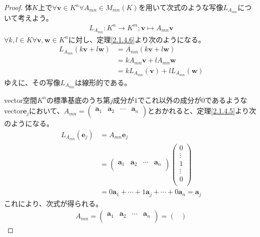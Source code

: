 \documentclass[dvipdfmx]{jsarticle}
\begin{document}
\begin{proof}
体$K$上で$\forall\mathbf{v} \in K^{n}\forall A_{mn} \in M_{mn}(K)$を用いて次式のような写像$L_{A_{mn}}$について考えよう。
\begin{align*}
L_{A_{mn}}:K^{n} \rightarrow K^{m};\mathbf{v} \mapsto A_{mn}\mathbf{v}
\end{align*}
$\forall k,l \in K\forall\mathbf{v},\mathbf{w} \in K^{n}$に対し、定理\ref{2.1.4.6}より次のようになる。
\begin{align*}
L_{A_{mn}}\left( k\mathbf{v} + l\mathbf{w} \right) &= A_{mn}\left( k\mathbf{v} + l\mathbf{w} \right)\\
&= kA_{mn}\mathbf{v} + lA_{mn}\mathbf{w}\\
&= kL_{A_{mn}}\left( \mathbf{v} \right) + lL_{A_{mn}}\left( \mathbf{w} \right)
\end{align*}
ゆえに、その写像$L_{A_{mn}}$は線形的である。\par
vector空間$K^{n}$の標準基底のうち第$j$成分が$1$でこれ以外の成分が$0$であるようなvector$\mathbf{e}_{j}$において、$A_{mn} = \begin{pmatrix}
\mathbf{a}_{1} & \mathbf{a}_{2} & \cdots & \mathbf{a}_{n} \\
\end{pmatrix}$とおかれると、定理\ref{2.1.4.5}より次のようになる。
\begin{align*}
L_{A_{mn}}\left( \mathbf{e}_{j} \right) &= A_{mn}\mathbf{e}_{j}\\
&= \begin{pmatrix}
\mathbf{a}_{1} & \mathbf{a}_{2} & \cdots & \mathbf{a}_{n} \\
\end{pmatrix}\begin{pmatrix}
0 \\
 \vdots \\
1 \\
 \vdots \\
0 \\
\end{pmatrix}\\
&= 0\mathbf{a}_{1} + \cdots + 1\mathbf{a}_{j} + \cdots + 0\mathbf{a}_{n} = \mathbf{a}_{j}
\end{align*}
これにより、次式が得られる。
\begin{align*}
A_{mn} = \begin{pmatrix}
\mathbf{a}_{1} & \mathbf{a}_{2} & \cdots & \mathbf{a}_{n} \\
\end{pmatrix} = \begin{pmatrix}

\end{pmatrix}
\end{align*}
\end{proof}
\end{document}
